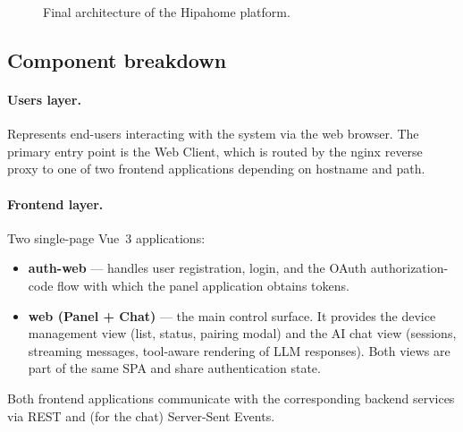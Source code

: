 \documentclass[a4paper,12pt]{article}
\begin{document}
\begin{figure}[h]
\caption{Final architecture of the Hipahome platform.}
\label{fig:arch}
\end{figure}

\subsection{Component breakdown}

\paragraph{Users layer.} Represents end-users interacting with the system via the web browser. The primary entry point is the Web Client, which is routed by the nginx reverse proxy to one of two frontend applications depending on hostname and path.

\paragraph{Frontend layer.} Two single-page Vue~3 applications:
\begin{itemize}
  \item \textbf{auth-web} --- handles user registration, login, and the OAuth authorization-code flow with which the panel application obtains tokens.
  \item \textbf{web (Panel + Chat)} --- the main control surface. It provides the device management view (list, status, pairing modal) and the AI chat view (sessions, streaming messages, tool-aware rendering of LLM responses). Both views are part of the same SPA and share authentication state.
\end{itemize}

Both frontend applications communicate with the corresponding backend services via REST and (for the chat) Server-Sent Events.
\end{document}
